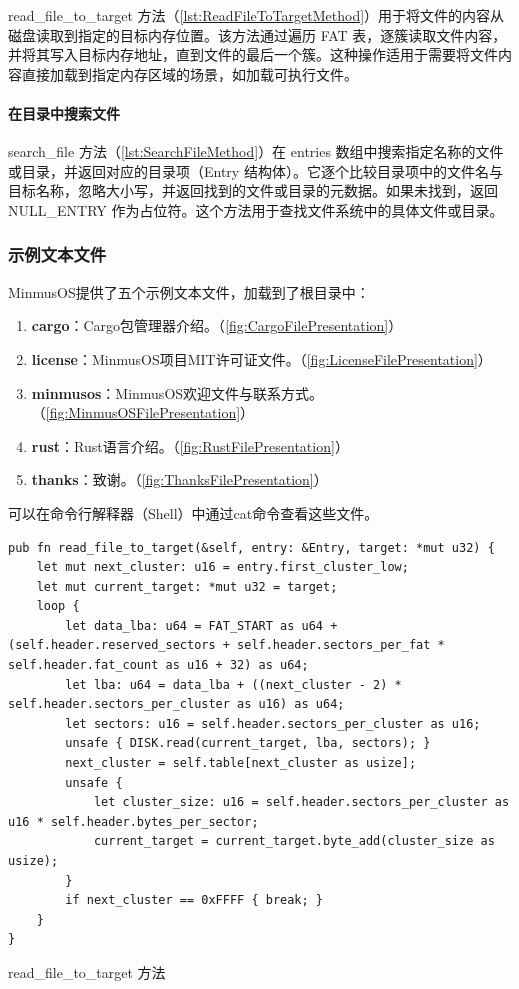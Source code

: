 read\_file\_to\_target 方法（\cref{lst:ReadFileToTargetMethod}）用于将文件的内容从磁盘读取到指定的目标内存位置。该方法通过遍历 FAT 表，逐簇读取文件内容，并将其写入目标内存地址，直到文件的最后一个簇。这种操作适用于需要将文件内容直接加载到指定内存区域的场景，如加载可执行文件。

\paragraph{在目录中搜索文件}

search\_file 方法（\cref{lst:SearchFileMethod}）在 entries 数组中搜索指定名称的文件或目录，并返回对应的目录项（Entry 结构体）。它逐个比较目录项中的文件名与目标名称，忽略大小写，并返回找到的文件或目录的元数据。如果未找到，返回 NULL\_ENTRY 作为占位符。这个方法用于查找文件系统中的具体文件或目录。

\subsubsection{示例文本文件}

MinmusOS提供了五个示例文本文件，加载到了根目录中：

\begin{enumerate}
    \item \textbf{cargo}：Cargo包管理器介绍。（\cref{fig:CargoFilePresentation}）
    \item \textbf{license}：MinmusOS项目MIT许可证文件。（\cref{fig:LicenseFilePresentation}）
    \item \textbf{minmusos}：MinmusOS欢迎文件与联系方式。（\cref{fig:MinmusOSFilePresentation}）
    \item \textbf{rust}：Rust语言介绍。（\cref{fig:RustFilePresentation}）
    \item \textbf{thanks}：致谢。（\cref{fig:ThanksFilePresentation}）
\end{enumerate}

可以在命令行解释器（Shell）中通过cat命令查看这些文件。

\begin{listing}[htbp]
    \begin{verbatim}
pub fn read_file_to_target(&self, entry: &Entry, target: *mut u32) {
    let mut next_cluster: u16 = entry.first_cluster_low;
    let mut current_target: *mut u32 = target;
    loop {
        let data_lba: u64 = FAT_START as u64 + (self.header.reserved_sectors + self.header.sectors_per_fat * self.header.fat_count as u16 + 32) as u64;
        let lba: u64 = data_lba + ((next_cluster - 2) * self.header.sectors_per_cluster as u16) as u64;
        let sectors: u16 = self.header.sectors_per_cluster as u16;
        unsafe { DISK.read(current_target, lba, sectors); }
        next_cluster = self.table[next_cluster as usize];
        unsafe {
            let cluster_size: u16 = self.header.sectors_per_cluster as u16 * self.header.bytes_per_sector;
            current_target = current_target.byte_add(cluster_size as usize);
        }
        if next_cluster == 0xFFFF { break; }
    }
}
    \end{verbatim}
    \caption{read\_file\_to\_target 方法}\label{lst:ReadFileToTargetMethod}
\end{listing}

